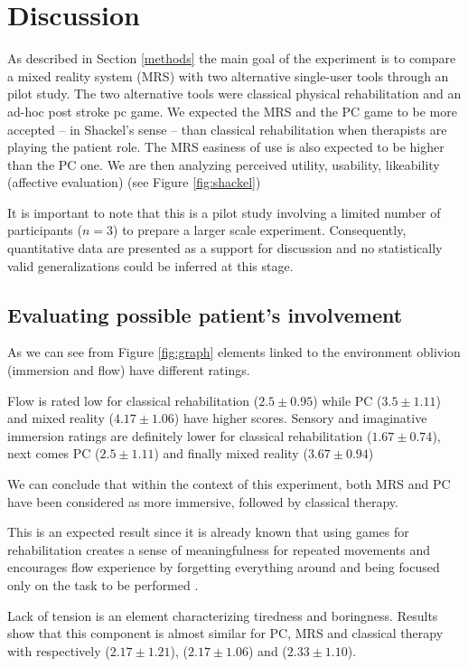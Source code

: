\documentclass[preprint,authoryear,12pt]{elsarticle}
\begin{document}
\section{Discussion}
\label{discussion}
As described in Section \ref{methods} the main goal of the experiment is to compare a mixed reality system (MRS) with two alternative single-user tools through an pilot study. The two alternative tools were classical physical rehabilitation and an ad-hoc post stroke pc game. We expected the MRS and the PC game to be more accepted  -- in Shackel's sense \citep{Shackel1991} -- than classical rehabilitation when therapists are playing the patient role. The MRS easiness of use is also expected to be higher than the PC one. We are then analyzing perceived utility, usability, likeability (affective evaluation) (see Figure \ref{fig:shackel})

It is important to note that this is a pilot study involving a limited number of participants ($n=3$) to prepare a larger scale experiment. Consequently, quantitative data are presented as a support for discussion and no statistically valid generalizations could be inferred at this stage.

\subsection{Evaluating possible patient's involvement}
\label{patient}
As we can see from Figure \ref{fig:graph} elements linked to the environment oblivion (immersion and flow) have different ratings. 

Flow is rated low for classical rehabilitation ($2.5 \pm 0.95$) while PC ($3.5 \pm 1.11$) and mixed reality ($4.17 \pm 1.06$) have higher scores. 
Sensory and imaginative immersion ratings are definitely lower for classical rehabilitation ($1.67 \pm 0.74$), next comes PC ($2.5 \pm 1.11$) and finally mixed reality ($3.67 \pm 0.94$)

We can conclude that within the context of this experiment, both MRS and PC have been considered as more immersive, followed by classical therapy. 

This is an expected result since it is already known that using games for rehabilitation creates a sense of meaningfulness for repeated movements and encourages flow experience by forgetting everything around and being focused only on the task to be performed \citep{Reid2004}.

Lack of tension is an element characterizing tiredness and boringness. Results show that this component is almost similar for PC, MRS and classical therapy with respectively ($2.17 \pm 1.21$), ($2.17 \pm 1.06$) and ($2.33 \pm 1.10$). 
\end{document}
